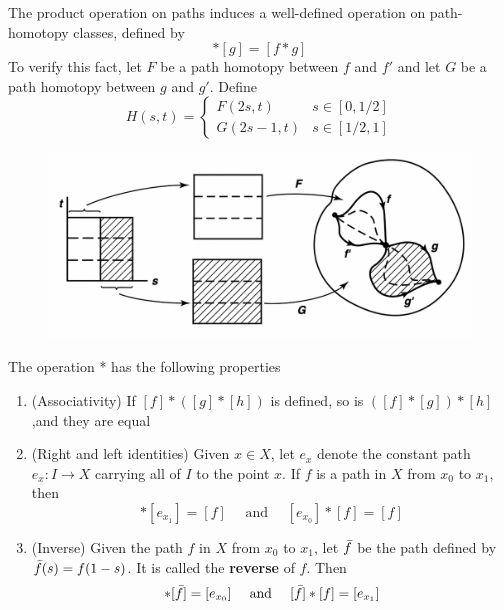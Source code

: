 \documentclass[11pt]{article}
\begin{document}
The product operation on paths induces a well-defined operation on path-homotopy classes, defined
by
\begin{equation*}
[f]*[g]=[f*g]
\end{equation*}
To verify this fact, let \(F\) be a path homotopy between \(f\) and \(f'\) and let \(G\) be a
path homotopy between \(g\) and \(g'\). Define
\begin{equation*}
H(s,t)=
\begin{cases}
F(2s,t)&s\in[0,1/2]\\
G(2s-1,t)&s\in[1/2,1]
\end{cases}
\end{equation*}
\begin{figure}[htbp]
\centering
\includegraphics[width=.8\textwidth]{../images/Topology/12.png}
\label{}
\end{figure}

\begin{theorem}[]
The operation * has the following properties
\begin{enumerate}
\item (Associativity) If \([f]*([g]*[h])\) is defined, so is \(([f]*[g])*[h]\),and they are equal
\item (Right and left identities) Given \(x\in X\), let \(e_x\) denote the constant path \(e_x:I\to X\)
carrying all of \(I\) to the point \(x\). If \(f\) is a path in \(X\) from \(x_0\) to \(x_1\),
then
\begin{equation*}
[f]*[e_{x_1}]=[f]\quad\text{ and }\quad[e_{x_0}]*[f]=[f]
\end{equation*}
\item (Inverse) Given the path \(f\) in \(X\) from \(x_0\) to \(x_1\), let \(\bar{f}\) be the path
defined by \(\bar{f}(s)=f(1-s)\). It is called the \textbf{reverse} of \(f\). Then
\begin{equation*}
[f]*[\barf]=[e_{x_0}]\quad\text{ and }\quad
[\barf]*[f]=[e_{x_1}]
\end{equation*}
\end{enumerate}
\end{theorem}
\end{document}
